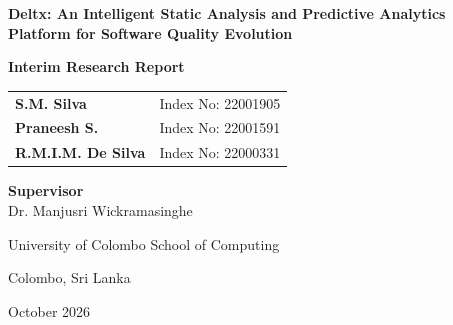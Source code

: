 \documentclass[12pt,a4paper,oneside]{report}
\begin{document}
\hypersetup{pageanchor=false}
\begin{titlepage}
    \centering
    \vspace*{1.2cm}

    {\Large \textbf{Deltx: An Intelligent Static Analysis and Predictive Analytics Platform for Software Quality Evolution}\par}
    \vspace{1.0cm}
    {\LARGE \textbf{Interim Research Report}\par}

    \vspace{1.8cm}

    \begin{tabular}{ll}
        \textbf{S.M. Silva} & Index No: 22001905 \\
        \textbf{Praneesh S.} & Index No: 22001591 \\
        \textbf{R.M.I.M. De Silva} & Index No: 22000331 \\
    \end{tabular}

    \vspace{1.5cm}

    \textbf{Supervisor}\\[0.25cm]
    Dr. Manjusri Wickramasinghe

    \vfill

    {\large University of Colombo School of Computing\par}
    {\large Colombo, Sri Lanka\par}
    \vspace{0.5cm}
    {\large October 2026\par}
\end{titlepage}

\hypersetup{pageanchor=true}
\end{document}
